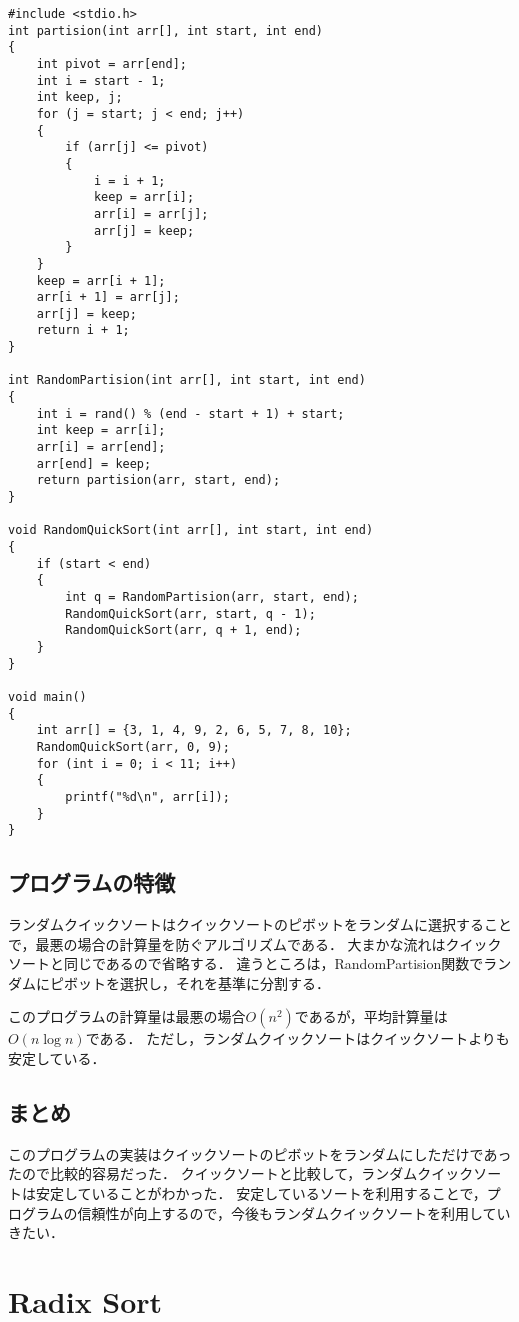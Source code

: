 \documentclass{ltjsarticle}
\begin{document}
\begin{lstlisting}[frame=single, lineskip=-5pt]
#include <stdio.h>
int partision(int arr[], int start, int end)
{
    int pivot = arr[end];
    int i = start - 1;
    int keep, j;
    for (j = start; j < end; j++)
    {
        if (arr[j] <= pivot)
        {
            i = i + 1;
            keep = arr[i];
            arr[i] = arr[j];
            arr[j] = keep;
        }
    }
    keep = arr[i + 1];
    arr[i + 1] = arr[j];
    arr[j] = keep;
    return i + 1;
}

int RandomPartision(int arr[], int start, int end)
{
    int i = rand() % (end - start + 1) + start;
    int keep = arr[i];
    arr[i] = arr[end];
    arr[end] = keep;
    return partision(arr, start, end);
}

void RandomQuickSort(int arr[], int start, int end)
{
    if (start < end)
    {
        int q = RandomPartision(arr, start, end);
        RandomQuickSort(arr, start, q - 1);
        RandomQuickSort(arr, q + 1, end);
    }
}

void main()
{
    int arr[] = {3, 1, 4, 9, 2, 6, 5, 7, 8, 10};
    RandomQuickSort(arr, 0, 9);
    for (int i = 0; i < 11; i++)
    {
        printf("%d\n", arr[i]);
    }
}
\end{lstlisting}

\subsection{プログラムの特徴}
ランダムクイックソートはクイックソートのピボットをランダムに選択することで，最悪の場合の計算量を防ぐアルゴリズムである．
大まかな流れはクイックソートと同じであるので省略する．
違うところは，RandomPartision関数でランダムにピボットを選択し，それを基準に分割する．

このプログラムの計算量は最悪の場合$O(n^2)$であるが，平均計算量は$O(n\log n)$である．
ただし，ランダムクイックソートはクイックソートよりも安定している．

\subsection{まとめ}
このプログラムの実装はクイックソートのピボットをランダムにしただけであったので比較的容易だった．
クイックソートと比較して，ランダムクイックソートは安定していることがわかった．
安定しているソートを利用することで，プログラムの信頼性が向上するので，今後もランダムクイックソートを利用していきたい．

\section{Radix Sort}
\end{document}
